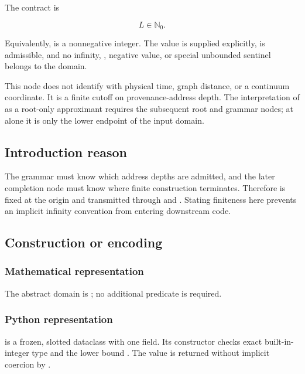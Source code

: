 The contract is

\[
L\in\mathbb N_0.
\]

Equivalently, \texttt{\protect{}} is a nonnegative integer. The value is supplied
explicitly, \texttt{\protect{}} is admissible, and no infinity,
\texttt{\protect{}}, negative value, or special unbounded sentinel belongs to
the domain.

This node does not identify \texttt{\protect{}} with physical time, graph
distance, or a continuum coordinate. It is a finite cutoff on
provenance-address depth. The interpretation of \texttt{\protect{}} as a
root-only approximant requires the subsequent root and grammar nodes; at
\texttt{\protect{}} alone it is only the lower endpoint of the input domain.

\subsection{Introduction reason}\label{introduction-reason-1}

The grammar \texttt{\protect{}} must know which address depths are admitted,
and the later completion node \texttt{\protect{}} must know where finite
construction terminates. Therefore \texttt{\protect{}} is fixed at the origin
and transmitted through \texttt{\protect{}} and \texttt{\protect{}}. Stating
finiteness here prevents an implicit infinity convention from entering
downstream code.

\subsection{Construction or encoding}\label{construction-or-encoding-1}

\subsubsection{Mathematical
representation}\label{mathematical-representation-1}

The abstract domain is \texttt{\protect{}}; no additional predicate is required.

\subsubsection{Python representation}\label{python-representation-1}

\texttt{\protect{}} is a frozen, slotted dataclass with one
\texttt{\protect{}} field. Its constructor checks exact built-in-integer type
and the lower bound \texttt{\protect{}}. The value is
returned without implicit coercion by \texttt{\protect{}}.

